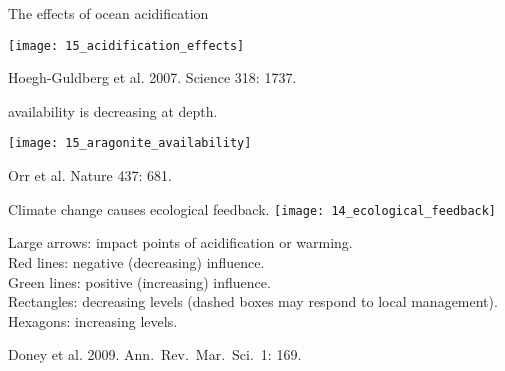 \documentclass[t]{beamer}
\begin{document}

\begin{frame}[t]{The effects of ocean acidification}

	\texttt{[image: 15\_acidification\_effects]}

	\vfilll
	
	\tiny \hfill Hoegh-Guldberg et al. 2007. Science 318: 1737.  

	
\end{frame}
%
{
\begin{frame}[b]

\hfill \tiny {}
\end{frame}
}
%
\begin{frame}{ availability is decreasing at depth.}

\vspace{-0.5\baselineskip}

\texttt{[image: 15\_aragonite\_availability]}

\vfilll

\tiny \hfill Orr et al. Nature 437: 681.  

\end{frame}


%
\begin{frame}{Climate change causes ecological feedback.}
\texttt{[image: 14\_ecological\_feedback]}

\bigskip

{\small
Large arrows: impact points of acidification or warming. \\
Red lines: negative (decreasing) influence. \\
Green lines: positive (increasing) influence. \\
Rectangles: decreasing levels (dashed boxes may respond to local management). \\
Hexagons: increasing levels.}

\end{frame}
%

{
\begin{frame}[b]

\hfill \tiny Doney et al. 2009. Ann.~Rev.~Mar.~Sci.~1: 169.  

\end{frame}
}
\end{document}
